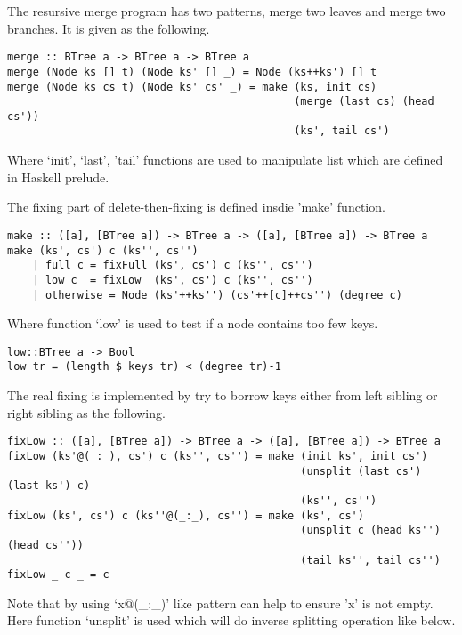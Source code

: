 \documentclass{article}
\begin{document}
The resursive merge program has two patterns, merge two leaves and
merge two branches. It is given as the following.

\begin{lstlisting}
merge :: BTree a -> BTree a -> BTree a
merge (Node ks [] t) (Node ks' [] _) = Node (ks++ks') [] t
merge (Node ks cs t) (Node ks' cs' _) = make (ks, init cs) 
                                             (merge (last cs) (head cs'))
                                             (ks', tail cs')
\end{lstlisting}

Where `init', `last', 'tail' functions are used to manipulate
list which are defined in Haskell prelude.

The fixing part of delete-then-fixing is defined insdie 'make' 
function.

\begin{lstlisting}
make :: ([a], [BTree a]) -> BTree a -> ([a], [BTree a]) -> BTree a
make (ks', cs') c (ks'', cs'')
    | full c = fixFull (ks', cs') c (ks'', cs'')
    | low c  = fixLow  (ks', cs') c (ks'', cs'')
    | otherwise = Node (ks'++ks'') (cs'++[c]++cs'') (degree c)
\end{lstlisting}

Where function `low' is used to test if a node contains too few keys.

\begin{lstlisting}
low::BTree a -> Bool
low tr = (length $ keys tr) < (degree tr)-1
\end{lstlisting} %

The real fixing is implemented by try to borrow keys either from
left sibling or right sibling as the following.

\begin{lstlisting}
fixLow :: ([a], [BTree a]) -> BTree a -> ([a], [BTree a]) -> BTree a
fixLow (ks'@(_:_), cs') c (ks'', cs'') = make (init ks', init cs') 
                                              (unsplit (last cs') (last ks') c) 
                                              (ks'', cs'')
fixLow (ks', cs') c (ks''@(_:_), cs'') = make (ks', cs')
                                              (unsplit c (head ks'') (head cs''))
                                              (tail ks'', tail cs'')
fixLow _ c _ = c
\end{lstlisting}

Note that by using `x@(\_:\_)' like pattern can help to ensure 'x' is
not empty. Here function `unsplit' is used which will do inverse
splitting operation like below.
\end{document}
